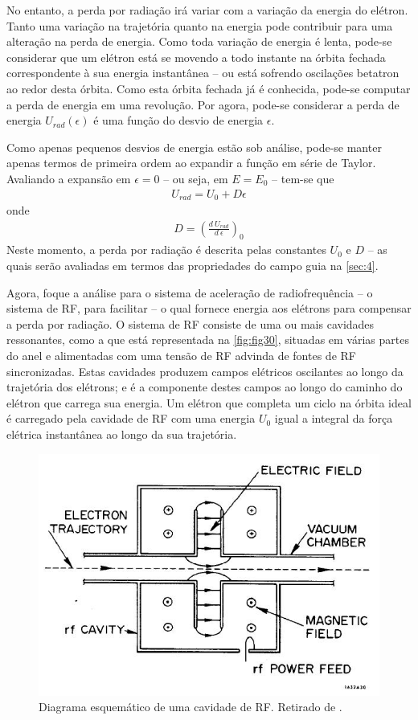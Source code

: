 No entanto, a perda por radiação irá variar com a variação da energia do elétron. Tanto uma variação na trajetória quanto na energia pode contribuir para uma alteração na perda de energia. Como toda variação de energia é lenta, pode-se considerar que um elétron está se movendo a todo instante na órbita fechada correspondente à sua energia instantânea -- ou está sofrendo oscilações betatron ao redor desta órbita. Como esta órbita fechada já é conhecida, pode-se computar a perda de energia em uma revolução. Por agora, pode-se considerar a perda de energia $U_{rad}(\epsilon)$ é uma função do desvio de energia $\epsilon$.

Como apenas pequenos desvios de energia estão sob análise, pode-se manter apenas termos de primeira ordem ao expandir a função em série de Taylor. Avaliando a expansão em $\epsilon=0$ -- ou seja, em $E=E_0$ -- tem-se que
\begin{align}
	U_{rad} = U_0 + D\epsilon\label{eq:3.23}
\end{align}
onde
\begin{align}
	D = \left(\frac{d\ U_{rad}}{d\ \epsilon}\right)_0
\end{align}
Neste momento, a perda por radiação é descrita pelas constantes $U_0$ e $D$ -- as quais serão avaliadas em termos das propriedades do campo guia na \autoref{sec:4}.

Agora, foque a análise para o sistema de aceleração de radiofrequência -- o sistema de RF, para facilitar -- o qual fornece energia aos elétrons para compensar a perda por radiação. O sistema de RF consiste de uma ou mais cavidades ressonantes, como a que está representada na \autoref{fig:fig30}, situadas em várias partes do anel e alimentadas com uma tensão de RF advinda de fontes de RF sincronizadas. Estas cavidades produzem campos elétricos oscilantes ao longo da trajetória dos elétrons; e é a componente destes campos ao longo do caminho do elétron que carrega sua energia. Um elétron que completa um ciclo na órbita ideal é carregado pela cavidade de RF com uma energia $U_0$ igual a integral da força elétrica instantânea ao longo da sua trajetória.

\begin{figure}[!htb]
	\centering
	\includegraphics[width=0.7\linewidth]{./Figuras/fig30.jpeg}
	\caption{Diagrama esquemático de uma cavidade de RF. Retirado de \cite{sands1970physics}.}
	\label{fig:fig30}
\end{figure}

